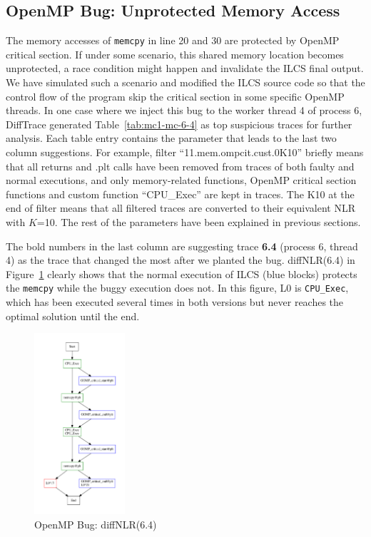 \subsection{OpenMP Bug: Unprotected Memory Access}





The memory accesses of \texttt{memcpy} in line 20 and 30 are protected by OpenMP critical section.
%
If under some scenario, this shared memory location becomes unprotected, a race condition might happen and invalidate the ILCS final output.
%
We have simulated such a scenario and modified the ILCS source code so that the control flow of the program skip the critical section in some specific OpenMP threads.
%
In one case where we inject this bug to the worker thread 4 of process 6, DiffTrace generated Table~\ref{tab:mc1-mc-6-4} as top suspicious traces for further analysis.
%
Each table entry contains the parameter that leads to the last two column suggestions.
%
For example, filter ``11.mem.ompcit.cust.0K10'' briefly means that all returns and .plt calls have been removed from traces of both faulty and normal executions, and only memory-related functions, OpenMP critical section functions and custom function ``CPU\_Exec'' are kept in traces.
%
The K10 at the end of filter means that all filtered traces are converted to their equivalent NLR with $K$=10.
%
The rest of the parameters have been explained in previous sections.
%

The bold numbers in the last column are suggesting trace \textbf{6.4} (process 6, thread 4) as the trace that changed the most after we planted the bug.
%
diffNLR(6.4) in Figure~\ref{diffNLR-6-4} clearly shows that the normal execution of ILCS (blue blocks) protects the \texttt{memcpy} while the buggy execution does not. In this figure, L0 is \texttt{CPU\_Exec}, which has been executed several times in both versions but never reaches the optimal solution until the end.
%


\begin{figure}[]
\centering
\includegraphics[width=0.3\textwidth]{figs/diffNLR/ompBug-6-4.pdf}
\caption{OpenMP Bug: diffNLR(6.4)}
\label{diffNLR-6-4}
\end{figure}

